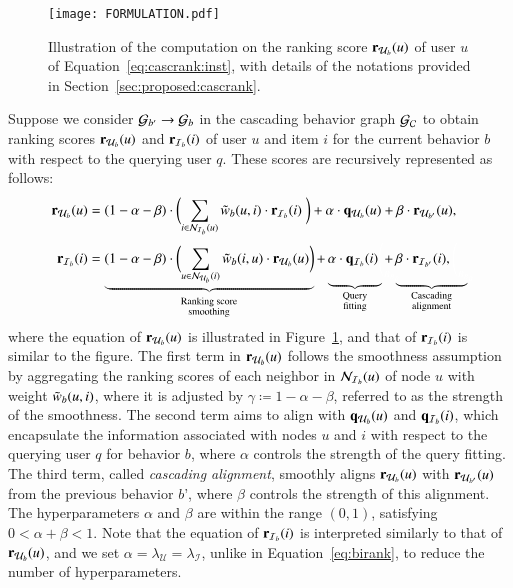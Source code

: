 \begin{figure}[t]
    \centering
    \texttt{[image: FORMULATION.pdf]}
    \caption{
        \label{fig:formulation}
        Illustration of the computation on the ranking score $\mathbf{r}_{\mathcal{U}_{b}}(u)$ of user $u$ of Equation~\eqref{eq:cascrank:inst}, with details of the notations provided in Section~\ref{sec:proposed:cascrank}. 
    }
\end{figure}Suppose we consider $\mathcal{G}_{b'} \rightarrow \mathcal{G}_{b}$ in the cascading behavior graph $\mathcal{G}_{\mathcal{C}}$ to obtain ranking scores $\mathbf{r}_{\mathcal{U}_{b}}(u)$ and $\mathbf{r}_{\mathcal{I}_{b}}(i)$ of user $u$ and item $i$ for the current behavior $b$ with respect to the querying user $q$. 
These scores are recursively represented as follows:
\begin{align}
    \label{eq:cascrank:inst}
    \begin{split}
    \rub(u) &= (1-\alpha-\beta) \cdot
    \biggl(
         \sum_{i \in \NIb{u}} \wuib \cdot \rib(i) \
    \biggr) + \alpha\cdot\qub(u) + \beta\cdot\rubp(u), \\
    \rib(i) &= \underbrace{(1-\alpha-\beta) \cdot \biggl(
    \sum_{u \in \NUb{i}}{\wiub \cdot \rub(u)} \biggr)}_{_{\substack{\text{Ranking score} \\ \text{smoothing}}}}
    + \underbrace{\alpha \cdot \qib(i)
        {\color{white}\Biggl(_{B_{B_{B}}}\!\!\!\!\!\!\!\!}
    }_{\substack{\text{Query} \\ \text{fitting}}}  + \underbrace{\beta \cdot \ribp(i), {\color{white}\Biggl(_{B_{B_{B}}}\!\!\!}}_{\substack{\text{Cascading} \\ \text{alignment}}}
    \end{split}
\end{align}
where the equation of $\mathbf{r}_{\mathcal{U}_{b}}(u)$ is illustrated in Figure~\ref{fig:formulation}, and that of $\mathbf{r}_{\mathcal{I}_{b}}(i)$ is similar to the figure.
The first term in $\mathbf{r}_{\mathcal{U}_{b}}(u)$ follows the smoothness assumption by aggregating the ranking scores of each neighbor in $\mathcal{N}_{\mathcal{I}_{b}}(u)$ of node $u$ with weight $\tilde{w}_{b}(u, i)$, where it is adjusted by $\gamma \coloneqq 1 - \alpha -\beta$, referred to as the strength of the smoothness.
The second term aims to align with $\mathbf{q}_{\mathcal{U}_{b}}(u)$ and $\mathbf{q}_{\mathcal{I}_{b}}(i)$, which encapsulate the information associated with nodes $u$ and $i$ with respect to the querying user $q$ for behavior $b$, where $\alpha$ controls the strength of the query fitting.
The third term, called \textit{cascading alignment}, smoothly aligns $\mathbf{r}_{\mathcal{U}_{b}}(u)$ with $\mathbf{r}_{\mathcal{U}_{b'}}(u)$ from the previous behavior $b’$, where $\beta$ controls the strength of this alignment.
The hyperparameters $\alpha$ and $\beta$ are within the range $(0, 1)$, satisfying $0 < \alpha + \beta < 1$.
%
Note that the equation of $\mathbf{r}_{\mathcal{I}_{b}}(i)$ is interpreted similarly to that of $\mathbf{r}_{\mathcal{U}_{b}}(u)$, and we set $\alpha = \lambda_{\mathcal{U}} = \lambda_{\mathcal{I}}$, unlike in Equation~\eqref{eq:birank}, to reduce the number of hyperparameters.

